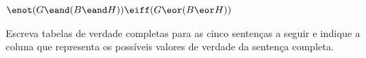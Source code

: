 \begin{earg}
\item $\enot(G \eand (B \eand H)) \eiff (G \eor (B \eor H))$
%


\end{earg}

\problempart
Escreva tabelas de verdade completas para as cinco sentenças a seguir e indique a coluna que representa os possíveis valores de verdade da sentença completa.

